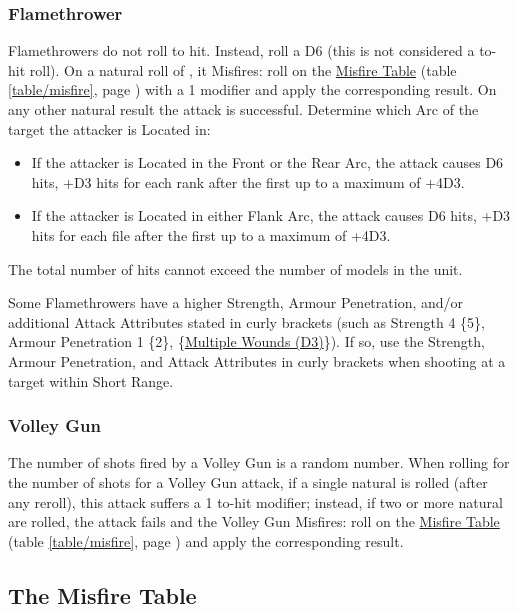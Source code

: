 \subsubsection{Flamethrower}
\idx[main=y]{\flamethrower}\label{flamethrower}

Flamethrowers do not roll to hit. Instead, roll a D6 (this is not considered a to-hit roll). On a natural roll of , it Misfires: roll on the \hyperref[the_misfire_table]{Misfire Table} (table \ref{table/misfire}, page \pageref{table/misfire}) with a \minuss{}1 modifier and apply the corresponding result. On any other natural result the attack is successful. Determine which Arc of the target the attacker is Located in:
\begin{itemize}
\item If the attacker is Located in the Front or the Rear Arc, the attack causes D6 hits, +D3 hits for each rank after the first up to a maximum of +4D3.
\item If the attacker is Located in either Flank Arc, the attack causes D6 hits, +D3 hits for each file after the first up to a maximum of +4D3.
\end{itemize}
The total number of hits cannot exceed the number of models in the unit.

Some Flamethrowers have a higher Strength, Armour Penetration, and/or additional Attack Attributes stated in curly brackets (such as Strength 4 \{5\}, Armour Penetration 1 \{2\}, \{\hyperref[multiple_wounds]{Multiple Wounds (D3)}\}). If so, use the Strength, Armour Penetration, and Attack Attributes in curly brackets when shooting at a target within Short Range.

\subsubsection{Volley Gun}
\idx[main=y]{\volleygun{}}\label{volley_gun}

The number of shots fired by a Volley Gun is a random number. When rolling for the number of shots for a Volley Gun attack, if a single natural  is rolled (after any reroll), this attack suffers a \minuss{}1 to-hit modifier; instead, if two or more natural  are rolled, the attack fails and the Volley Gun Misfires: roll on the \hyperref[the_misfire_table]{Misfire Table} (table \ref{table/misfire}, page \pageref{table/misfire}) and apply the corresponding result.

\newpage
\subsection{The Misfire Table}
\label{the_misfire_table}

